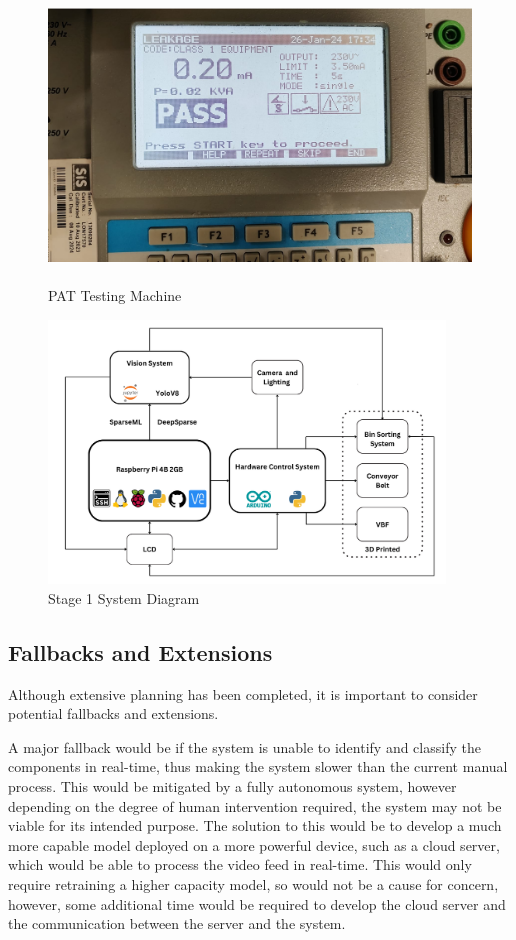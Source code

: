 \begin{figure}[t]
  \begin{minipage}[t]{0.49\textwidth}
      \centering
      \includegraphics[width=\textwidth,height=7cm, keepaspectratio]{imgs/pattesting.jpeg}
      \caption{PAT Testing Machine}
      \label{fig:pat}
    \end{minipage}
    \hfill
    \begin{minipage}[t]{0.49\textwidth}
      \centering
      \includegraphics[width=\textwidth,height=7cm, keepaspectratio]{imgs/diagrams/systemdiagram.png}
      \caption{Stage 1 System Diagram}
      \label{fig:sysdiagram}
    \end{minipage}
    \hfill
\end{figure}

\subsection{Fallbacks and Extensions}
Although extensive planning has been completed, it is important to consider potential fallbacks and extensions.

A major fallback would be if the system is unable to identify and classify the components in real-time, thus making
the system slower than the current manual process. This would be mitigated by a fully autonomous system, however
depending on the degree of human intervention required, the system may not be viable for its intended purpose. The solution
to this would be to develop a much more capable model deployed on a more powerful device, such as a cloud server, which would
be able to process the video feed in real-time. This would only require retraining a higher capacity model, so would not be a cause for 
concern, however, some additional time would be required to develop the cloud server and the communication between the server and the system.

